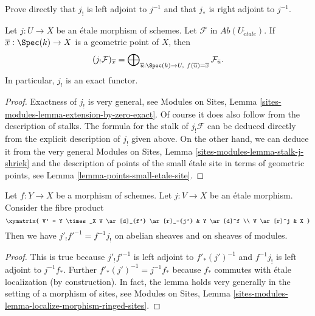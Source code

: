 \begin{exercise}
\label{exercise-jshriek-direct}
Prove directly that $j_!$ is left adjoint to $j^{-1}$ and that $j_*$ is right
adjoint to $j^{-1}$.
\end{exercise}

\begin{proposition}
\label{proposition-describe-jshriek}
Let $j : U \to X$ be an \'etale morphism of schemes.
Let $\mathcal{F}$ in $\textit{Ab}(U_{\acute{e}tale})$.
If $\overline{x} : \Spec(k) \to X$ is a geometric point of $X$, then 
$$
(j_!\mathcal{F})_{\overline{x}} =
\bigoplus\nolimits_{\overline{u} : \Spec(k) \to U,\ f(\overline{u}) =
\overline{x}} \mathcal{F}_{\bar{u}}.
$$
In particular, $j_!$ is an exact functor.
\end{proposition}

\begin{proof}
Exactness of $j_!$ is very general, see Modules on Sites, 
Lemma \ref{sites-modules-lemma-extension-by-zero-exact}.
Of course it does also follow from the description of stalks.
The formula for the stalk of $j_!\mathcal{F}$ can be deduced
directly from the explicit description of $j_!$ given above.
On the other hand, we can deduce it from the very general
Modules on Sites, Lemma \ref{sites-modules-lemma-stalk-j-shriek}
and the description of points of the small \'etale site
in terms of geometric points, see
Lemma \ref{lemma-points-small-etale-site}.
\end{proof}

\begin{lemma}
\label{lemma-shriek-base-change}
Let $f: Y \to X$ be a morphism of schemes. Let $j: V \to X$ be an \'etale
morphism. Consider the fibre product
$$
\xymatrix{
V' = Y \times_X V \ar[d]_{f'} \ar[r]_-{j'} & Y \ar[d]^f \\
V \ar[r]^j & X
}
$$
Then we have $j'_! f'^{-1} = f^{-1} j_!$ on abelian sheaves and on
sheaves of modules.
\end{lemma}

\begin{proof}
This is true because $j'_! f'^{-1}$ is left adjoint to
$f'_* (j')^{-1}$ and $f^{-1} j_!$ is left adjoint to $j^{-1}f_*$.
Further $f'_* (j')^{-1} = j^{-1}f_*$ because $f_*$ commutes with
\'etale localization (by construction). In fact, the lemma holds very generally
in the setting of a morphism of sites, see
Modules on Sites, Lemma
\ref{sites-modules-lemma-localize-morphism-ringed-sites}.
\end{proof}

